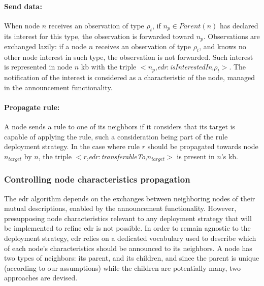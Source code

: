 \documentclass[sw]{iosart2x}
\newcommand{\namespace}[1]{\textit{#1$:$}}
\newcommand{\concept}[2]{\namespace{#1}\-\textit{#2}}
\newcommand{\triplet}[3]{$<$#1,\textit{#2},#3$>$}
\begin{document}
\paragraph{Send data:}
\label{par:data_transfer}
When node $n$ receives an observation of type $\rho_t$, if $n_p \in Parent(n)$ has declared its interest for this type, the observation is forwarded toward $n_{p}$.
Observations are exchanged lazily: if a node $n$ receives an observation of type $\rho_t$, and knows no other node interest in such type, the observation is not forwarded.
Such interest is represented in node $n$ \gls{kb} with the triple \triplet{$n_{p}$}{\concept{edr}{is\-Interested\-In}}{$\rho_t$}.
The notification of the interest is considered as a characteristic of the node, managed in the announcement functionality.

\paragraph{Propagate rule:}
\label{par:send_rule}
A node sends a rule to one of its neighbors if it considers that its target is capable of applying the rule, such a consideration being part of the rule deployment strategy. 
In the case where rule $r$ should be propagated towards node $n_{target}$ by $n$, the triple \triplet{$r$}{\concept{edr}{transferable\-To}}{$n_{target}$} is present in $n$'s \gls{kb}.

\subsubsection{Controlling node characteristics propagation}
\label{subsubs:annouce}

The \gls{edr} algorithm depends on the exchanges between neighboring nodes of their mutual descriptions, enabled by the announcement functionality.
However, presupposing node characteristics relevant to any deployment strategy that will be implemented to refine \gls{edr} is not possible.
In order to remain agnostic to the deployment strategy, \gls{edr} relies on a dedicated vocabulary used to describe which of each node's characteristics should be announced to its neighbors. 
A node has two types of neighbors: its parent, and its children, and since the parent is unique (according to our assumptions) while the children are potentially many, two approaches are devised.
\end{document}
